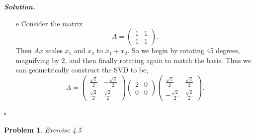 \documentclass[12pt]{report}
\newtheorem{problem}{Problem}
\newenvironment{solution}[1][\it{Solution}]{\textbf{#1. } }{$\square$}
\begin{document}
\begin{solution}
\begin{enumerate}
        \item [e] Consider the matrix $$A = \begin{pmatrix} 1&1\\1&1 \end{pmatrix}.$$ Then $Ax$ scales $x_1$ and $x_2$ to $x_1 + x_2$. So we begin by rotating 45 degrees, magnifying by $2$, and then finally rotating again to match the basis. Thus we can geometrically construct the SVD to be, $$A = \begin{pmatrix} \frac{\sqrt{2}}{2}&-\frac{\sqrt{2}}{2}\\\frac{\sqrt{2}}{2}&\frac{\sqrt{2}}{2}\end{pmatrix}\begin{pmatrix} 2&0\\0&0\end{pmatrix}\begin{pmatrix} \frac{\sqrt{2}}{2}&\frac{\sqrt{2}}{2}\\-\frac{\sqrt{2}}{2}&\frac{\sqrt{2}}{2}\end{pmatrix}.$$
    \end{enumerate}
\end{solution}

\newpage



\begin{problem}
    Exercise 4.5
\end{problem}
\end{document}
